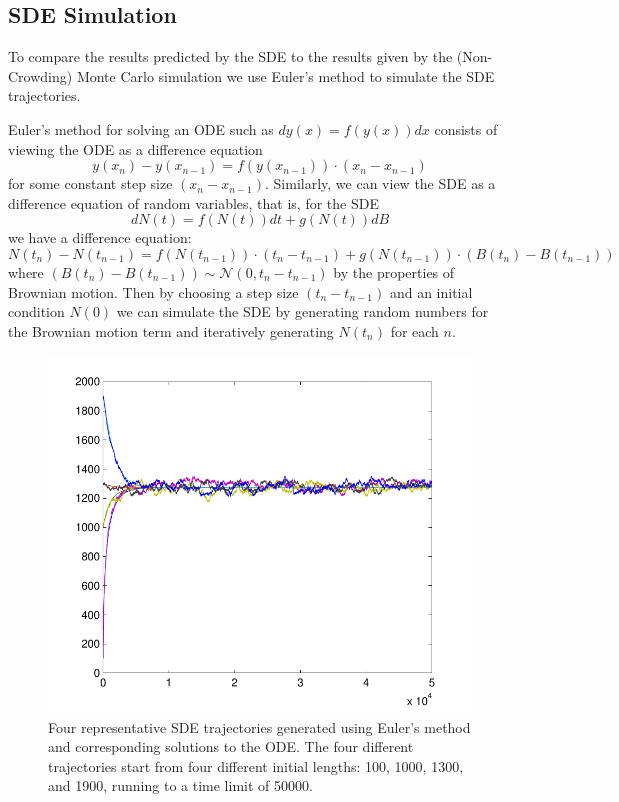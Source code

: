 \documentclass[titlepage]{article}
\newcommand{\Normal}{\mathcal{N}}
\begin{document}
\subsection{SDE Simulation}

To compare the results predicted by the SDE to the results given by the (Non-Crowding) Monte Carlo simulation we use Euler's method to simulate the SDE trajectories.

Euler's method for solving an ODE such as $dy(x) = f(y(x))dx$ consists of viewing the ODE as a difference equation
\[ y(x_n) - y(x_{n-1}) = f(y(x_{n-1}))\cdot(x_n - x_{n-1}) \]
for some constant step size $(x_n - x_{n-1})$.
Similarly, we can view the SDE as a difference equation of random variables, that is, for the SDE
\[ dN(t) = f(N(t))dt + g(N(t))dB \]
we have a difference equation:
\[ N(t_n) - N(t_{n-1}) = f(N(t_{n-1}))\cdot(t_n - t_{n-1}) + g(N(t_{n-1}))\cdot(B(t_n) - B(t_{n-1})) \]
where $(B(t_n) - B(t_{n-1})) \sim \Normal(0, t_n - t_{n-1})$ by the properties of Brownian motion.
Then by choosing a step size $(t_n - t_{n-1})$ and an initial condition $N(0)$ we can simulate the SDE by generating random numbers for the Brownian motion term and iteratively generating $N(t_n)$ for each $n$.

\begin{figure}%
\centering
\includegraphics[width=\textwidth]{SDEtraj}
\caption{
Four representative SDE trajectories generated using Euler's method and corresponding solutions to the ODE.
The four different trajectories start from four different initial lengths: 100, 1000, 1300, and 1900, running to a time limit of 50000.}
\label{fig:SDEtraj}
\end{figure}
\end{document}
